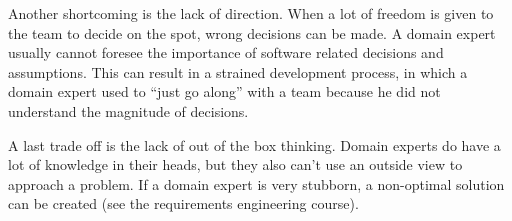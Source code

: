 Another shortcoming is the lack of direction. 
When a lot of freedom is given to the team to decide on the spot, wrong decisions can be made. A domain expert usually cannot foresee the importance of software related decisions and assumptions. 
This can result in a strained development process, in which a domain expert used to ``just go along'' with a team because he did not understand the magnitude of decisions. 

A last trade off is the lack of out of the box thinking. Domain experts do have a lot of knowledge in their heads, but they also can't use an outside view to approach a problem. 
If a domain expert is very stubborn, a non-optimal solution can be created (see the requirements engineering course).



